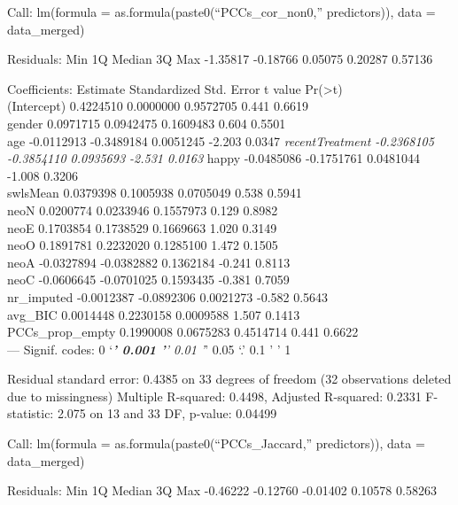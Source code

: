 \documentclass[
  english,
  man]{apa6}
\begin{document}
Call:
lm(formula = as.formula(paste0(``PCCs\_cor\_non0,'' predictors)),
data = data\_merged)

Residuals:
Min 1Q Median 3Q Max
-1.35817 -0.18766 0.05075 0.20287 0.57136

Coefficients:
Estimate Standardized Std. Error t value Pr(\textgreater\textbar t\textbar)\\
(Intercept) 0.4224510 0.0000000 0.9572705 0.441 0.6619\\
gender 0.0971715 0.0942475 0.1609483 0.604 0.5501\\
age -0.0112913 -0.3489184 0.0051245 -2.203 0.0347 \emph{
recentTreatment -0.2368105 -0.3854110 0.0935693 -2.531 0.0163 }
happy -0.0485086 -0.1751761 0.0481044 -1.008 0.3206\\
swlsMean 0.0379398 0.1005938 0.0705049 0.538 0.5941\\
neoN 0.0200774 0.0233946 0.1557973 0.129 0.8982\\
neoE 0.1703854 0.1738529 0.1669663 1.020 0.3149\\
neoO 0.1891781 0.2232020 0.1285100 1.472 0.1505\\
neoA -0.0327894 -0.0382882 0.1362184 -0.241 0.8113\\
neoC -0.0606645 -0.0701025 0.1593435 -0.381 0.7059\\
nr\_imputed -0.0012387 -0.0892306 0.0021273 -0.582 0.5643\\
avg\_BIC 0.0014448 0.2230158 0.0009588 1.507 0.1413\\
PCCs\_prop\_empty 0.1990008 0.0675283 0.4514714 0.441 0.6622\\
---
Signif. codes: 0 `\emph{\textbf{' 0.001 '}' 0.01 '}' 0.05 `.' 0.1 ' ' 1

Residual standard error: 0.4385 on 33 degrees of freedom
(32 observations deleted due to missingness)
Multiple R-squared: 0.4498, Adjusted R-squared: 0.2331
F-statistic: 2.075 on 13 and 33 DF, p-value: 0.04499

Call:
lm(formula = as.formula(paste0(``PCCs\_Jaccard,'' predictors)),
data = data\_merged)

Residuals:
Min 1Q Median 3Q Max
-0.46222 -0.12760 -0.01402 0.10578 0.58263
\end{document}
